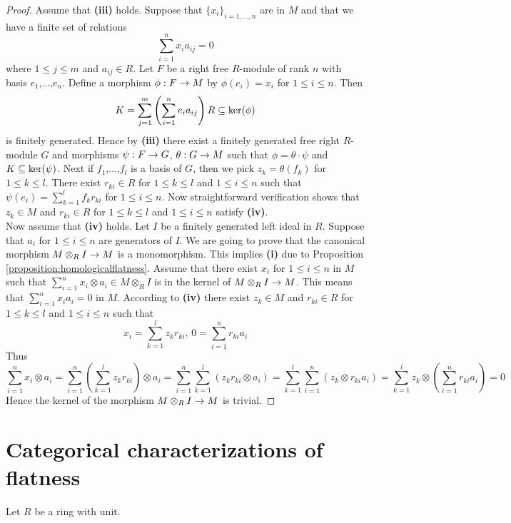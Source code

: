 \begin{proof}
Assume that \textbf{(iii)} holds. Suppose that $\{x_i\}_{i=1,...,n}$ are in $M$ and that we have a finite set of relations
$$\sum^n_{i=1}x_ia_{ij}=0$$
where $1\leq j\leq m$ and $a_{ij}\in R$. Let $F$ be a right free $R$-module of rank $n$ with basis $e_1$,...,$e_n$. Define a morphism $\phi:F\rightarrow M$ by $\phi(e_i)=x_i$ for $1\leq i\leq n$. Then 
$$K=\sum_{j=1}^m\left(\sum_{i=1}^ne_ia_{ij}\right)R\subseteq \mathrm{ker}(\phi)$$
is finitely generated. Hence by \textbf{(iii)} there exist a finitely generated free right $R$-module $G$ and morphisms $\psi:F\rightarrow G$, $\theta:G\rightarrow M$ such that $\phi=\theta \cdot \psi$ and $K\subseteq \mathrm{ker}(\psi)$. Next if $f_1$,...,$f_l$ is a basis of $G$, then we pick $z_k=\theta(f_k)$ for $1\leq k\leq l$. There exist $r_{ki}\in R$ for $1\leq k\leq l$ and $1\leq i\leq n$ such that $\psi(e_i)=\sum_{k=1}^lf_kr_{ki}$ for $1\leq i\leq n$. Now straightforward verification shows that $z_k\in M$ and $r_{ki}\in R$ for $1\leq k\leq l$ and $1\leq i\leq n$ satisfy \textbf{(iv)}.\\
Now assume that \textbf{(iv)} holds. Let $I$ be a finitely generated left ideal in $R$. Suppose that $a_i$ for $1\leq i \leq n$ are generators of $I$. We are going to prove that the canonical morphism $M\otimes_RI\rightarrow M$ is a monomorphism. This implies \textbf{(i)} due to Proposition \ref{proposition:homologicalflatness}. Assume that there exist $x_i$ for $1\leq i\leq n$ in $M$ such that $\sum_{i=1}^nx_i\otimes a_i\in M\otimes_RI$ is in the kernel of $M\otimes_RI\rightarrow M$. This means that $\sum_{i=1}^nx_ia_i=0$ in $M$. According to \textbf{(iv)} there exist $z_k\in M$ and $r_{ki}\in R$ for $1\leq k\leq l$ and $1\leq i\leq n$ such that
$$x_i=\sum^l_{k=1}z_kr_{ki},\,0=\sum^n_{i=1}r_{ki}a_{i}$$
Thus
$$\sum_{i=1}^nx_i\otimes a_i=\sum_{i=1}^n\left(\sum_{k=1}^lz_kr_{ki}\right)\otimes a_i=\sum_{i=1}^n\sum_{k=1}^l\left(z_kr_{ki}\otimes a_i\right)=\sum_{k=1}^l\sum_{i=1}^n\left(z_k\otimes r_{ki}a_i\right)=\sum_{k=1}^lz_k\otimes \left(\sum_{i=1}^nr_{ki}a_i\right)=0$$
Hence the kernel of the morphism $M\otimes_RI\rightarrow M$ is trivial.
\end{proof}

\section{Categorical characterizations of flatness}
\noindent
Let $R$ be a ring with unit.

